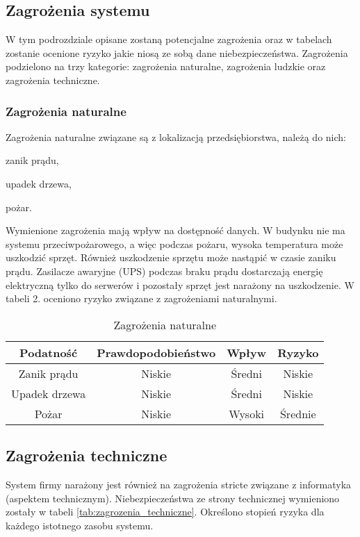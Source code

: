 \subsection{Zagrożenia systemu}
W tym podrozdziale opisane zostaną potencjalne zagrożenia oraz w tabelach zostanie ocenione ryzyko jakie niosą ze sobą dane niebezpieczeństwa. Zagrożenia podzielono na trzy kategorie: zagrożenia naturalne, zagrożenia ludzkie oraz zagrożenia techniczne.

\subsubsection{Zagrożenia naturalne} 
Zagrożenia naturalne związane są z lokalizacją przedsiębiorstwa, należą do nich:
\begin{itemize*}
	\item zanik prądu,
	\item upadek drzewa,
	\item pożar.
\end{itemize*}

Wymienione zagrożenia mają wpływ na dostępność danych. W budynku nie ma systemu przeciwpożarowego, a więc podczas pożaru, wysoka temperatura może uszkodzić sprzęt. Również uszkodzenie sprzętu może nastąpić w czasie zaniku prądu. Zasilacze awaryjne (UPS) podczas braku prądu dostarczają energię elektryczną tylko do serwerów i pozostały sprzęt jest narażony na uszkodzenie. W tabeli 2. oceniono ryzyko związane z zagrożeniami naturalnymi.
\begin{table}[!ht]
	\centering
	\caption{Zagrożenia naturalne}
	\label{zagrożeniaNaturalne}
	\begin{tabular}{|c|c|c|c|}
		\hline
		\textbf{Podatność} & \textbf{Prawdopodobieństwo} & \textbf{Wpływ} & \textbf{Ryzyko} \\ \hline
		Zanik prądu        & Niskie                      & Średni         & Niskie          \\ \hline
		Upadek drzewa      & Niskie                      & Średni         & Niskie          \\ \hline
		Pożar              & Niskie                      & Wysoki        & Średnie         \\ \hline
	\end{tabular}
\end{table}

\subsection{Zagrożenia techniczne}
System firmy narażony jest również na zagrożenia stricte związane z informatyka (aspektem technicznym). Niebezpieczeństwa ze strony technicznej wymieniono zostały w tabeli  \ref{tab:zagrozenia_techniczne}. Określono stopień ryzyka dla każdego istotnego zasobu systemu.

